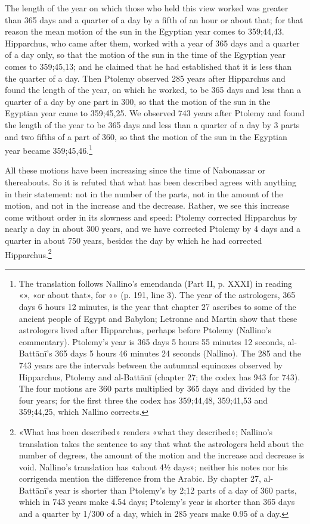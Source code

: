 \documentclass[11pt]{article}
\begin{document}
\par The length of the year on which those who held this view worked was greater than 365 days and a quarter of a day by a fifth of an hour or about that; for that reason the mean motion of the sun in the Egyptian year comes to 359;44,43. Hipparchus, who came after them, worked with a year of 365 days and a quarter of a day only, so that the motion of the sun in the time of the Egyptian year comes to 359;45,13; and he claimed that he had established that it is less than the quarter of a day. Then Ptolemy observed 285 years after Hipparchus and found the length of the year, on which he worked, to be 365 days and less than a quarter of a day by one part in 300, so that the motion of the sun in the Egyptian year came to 359;45,25. We observed 743 years after Ptolemy and found the length of the year to be 365 days and less than a quarter of a day by 3 parts and two fifths of a part of 360, so that the motion of the sun in the Egyptian year became 359;45,46.\footnote{The translation follows Nallino's emendanda (Part II, p. XXXI) in reading «», «or about that», for «» (p. 191, line 3). The year of the astrologers, 365 days 6 hours 12 minutes, is the year that chapter 27 ascribes to some of the ancient people of Egypt and Babylon; Letronne and Martin show that these astrologers lived after Hipparchus, perhaps before Ptolemy (Nallino's commentary). Ptolemy's year is 365 days 5 hours 55 minutes 12 seconds, al-Battānī's 365 days 5 hours 46 minutes 24 seconds (Nallino). The 285 and the 743 years are the intervals between the autumnal equinoxes observed by Hipparchus, Ptolemy and al-Battānī (chapter 27; the codex has 943 for 743). The four motions are 360 parts multiplied by 365 days and divided by the four years; for the first three the codex has 359;44,48, 359;41,53 and 359;44,25, which Nallino corrects.}\par
\par All these motions have been increasing since the time of Nabonassar or thereabouts. So it is refuted that what has been described agrees with anything in their statement: not in the number of the parts, not in the amount of the motion, and not in the increase and the decrease. Rather, we see this increase come without order in its slowness and speed: Ptolemy corrected Hipparchus by nearly a day in about 300 years, and we have corrected Ptolemy by 4 days and a quarter in about 750 years, besides the day by which he had corrected Hipparchus.\footnote{«What has been described» renders «what they described»; Nallino's translation takes the sentence to say that what the astrologers held about the number of degrees, the amount of the motion and the increase and decrease is void. Nallino's translation has «about 4½ days»; neither his notes nor his corrigenda mention the difference from the Arabic. By chapter 27, al-Battānī's year is shorter than Ptolemy's by 2;12 parts of a day of 360 parts, which in 743 years make 4.54 days; Ptolemy's year is shorter than 365 days and a quarter by 1/300 of a day, which in 285 years make 0.95 of a day.}\par
\end{document}
